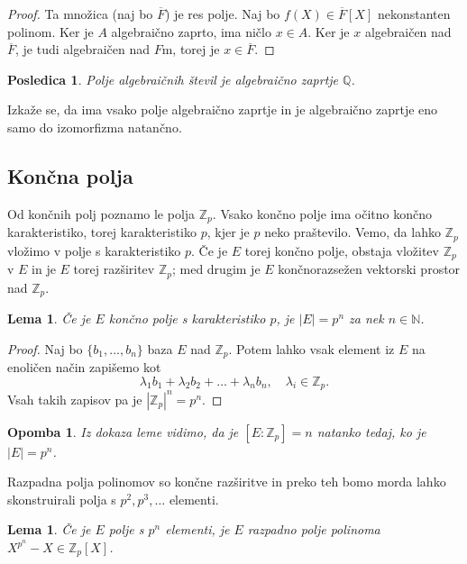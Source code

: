 \documentclass[10pt, a4paper]{article}
\newtheorem{posledica}[izr]{Posledica}
\newtheorem*{opomba}{Opomba}
\newtheorem{lema}[izr]{Lema}
\newenvironment{noticeC}{%
  \tcolorbox[%
  notitle,
  empty,
  enhanced,  %
  breakable,
  coltext=black, 
  fontupper=\rmfamily,
  parbox=false,
  noparskip,
  sharp corners,
  boxrule=-1pt,  %
  frame hidden,
  left=7pt,  %
  right=7pt,
  top=5pt,
  bottom=5pt,
  before skip=2.5ex plus 2pt,
  after skip=2.5ex plus 2pt,
  overlay unbroken and last={%
  },
  ]}
{\endtcolorbox}
\newenvironment{dokaz}%
  {\begin{noticeC}\begin{proof}}%
  {\end{proof}\end{noticeC}}
\newcommand{\N}{\mathbb {N}}
\newcommand{\Z}{\mathbb {Z}}
\newcommand{\Q}{\mathbb {Q}}
\begin{document}
\begin{dokaz}
  Ta množica (naj bo $\overline{F}$) je res polje. Naj bo $f(X) \in \overline{F}[X]$ 
  nekonstanten polinom. Ker je $A$ algebraično zaprto, ima ničlo $x \in A$.
  Ker je $x$ algebraičen nad $\overline{F}$, je tudi algebraičen nad $F$m, torej je $x \in \overline{F}$.
\end{dokaz}

\begin{posledica}
  Polje algebraičnih števil je algebraično zaprtje $\Q$.
\end{posledica}

Izkaže se, da ima vsako polje algebraično zaprtje in je algebraično zaprtje eno samo do izomorfizma natančno.

\subsection{Končna polja}

Od končnih polj poznamo le polja $\Z_p$. Vsako končno polje ima očitno končno karakteristiko,
torej karakteristiko $p$, kjer je $p$ neko praštevilo. Vemo, da lahko $\Z_p$ vložimo v polje s karakteristiko $p$.
Če je $E$ torej končno polje, obstaja vložitev $\Z_p$ v $E$ in je $E$ torej razširitev $\Z_p$;
med drugim je $E$ končnorazsežen vektorski prostor nad $\Z_p$. 

\begin{lema}
  Če je $E$ končno polje s karakteristiko $p$, je $|E| = p^n$ za nek $n \in \N$.
\end{lema}

\begin{dokaz}
  Naj bo $\{b_1, \dots, b_n\}$ baza $E$ nad $\Z_p$.
  Potem lahko vsak element iz $E$ na enoličen način zapišemo kot 
  $$\lambda_1 b_1 + \lambda_2 b_2 + \dots + \lambda_n b_n,\quad \lambda_i \in \Z_p.$$
  Vsah takih zapisov pa je $|\Z_p|^n = p^n.$
\end{dokaz}

\begin{opomba}
  Iz dokaza leme vidimo, da je $[E : \Z_p] = n$ natanko tedaj, ko je $|E| = p^n$.
\end{opomba}

Razpadna polja polinomov so končne razširitve in preko teh bomo morda lahko skonstruirali 
polja s $p^2, p^3, \dots$ elementi.

\begin{lema}
  Če je $E$ polje s $p^n$ elementi, je $E$ razpadno polje polinoma $X^{p^n} - X \in \Z_p [X]$.
\end{lema}
\end{document}
